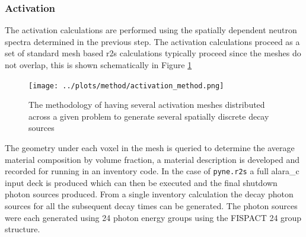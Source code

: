 \documentclass[12pt]{article}
\begin{document}

\subsubsection{Activation}
The activation calculations are performed using the spatially dependent neutron
spectra determined in the previous step. The activation calculations proceed as
a set of standard mesh based \gls{r2s} calculations typically proceed since the 
meshes do not overlap, this is shown schematically in Figure
\ref{fig:activation_method}
\begin{figure}[ht!]
  \centering
  \texttt{[image: ../plots/method/activation\_method.png]}
  \caption{The methodology of having several activation meshes distributed
           across a given problem to generate several spatially discrete
           decay sources}
  \label{fig:activation_method}
\end{figure}
The geometry under each voxel in the mesh is queried to 
determine the average material composition by volume fraction, a material 
description is developed and recorded for running in an inventory code. In the 
case of \texttt{pyne.r2s} a full \gls{alara_c} input deck is produced which can
then be executed and the final shutdown photon sources produced. From a single
inventory calculation the decay photon sources for all the subsequent decay
times can be generated.  The photon sources were each generated using 24 photon
energy groups using the FISPACT 24 group structure.
\end{document}
